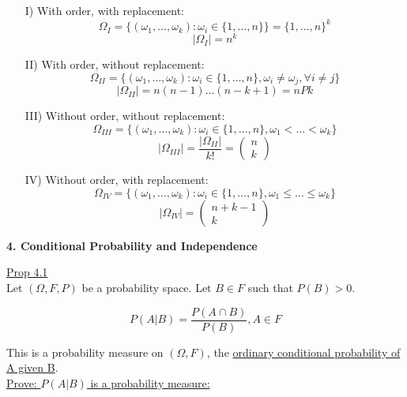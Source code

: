 \documentclass[10pt,letterpaper]{article}
\begin{document}
\begin{enumerate}
\item[I)] With order, with replacement:
$$\Omega_I=\{(\omega_1,\dots,\omega_k):\omega_i\in \{1,\dots,n\}\}=\{1,\dots,n\}^k$$
$$|\Omega_I|=n^k$$

\item[II)] With order, without replacement:
$$\Omega_{II}=\{(\omega_1,\dots,\omega_k):\omega_i\in \{1,\dots,n\}, \omega_i\neq\omega_j,
\forall i\neq j\}$$
$$|\Omega_{II}|=n(n-1)\dots (n-k+1)=nPk$$

\item[III)] Without order, without replacement:
$$\Omega_{III}=\{(\omega_1,\dots,\omega_k):\omega_i\in \{1,\dots,n\}, \omega_1<\dots<\omega_k\}$$
$$|\Omega_{III}|=\frac{|\Omega_{II}|}{k!}=
\begin{pmatrix}
    n\\
    k
\end{pmatrix}$$

\item[IV)] Without order, with replacement:
$$\Omega_{IV}=\{(\omega_1,\dots,\omega_k):\omega_i\in \{1,\dots,n\}, \omega_1\leq\dots\leq\omega_k\}$$
$$|\Omega_{IV}|=
\begin{pmatrix}
    n+k-1\\
    k
\end{pmatrix}$$

\end{enumerate}

\pagebreak

\begin{center}
\textbf{4. Conditional Probability and Independence}
\end{center}

\underline{Prop 4.1}\\

Let $(\Omega, F, P)$ be a probability space. Let $B\in F$ such that $P(B)>0$.

$$P(A|B)=\frac{P(A\cap B)}{P(B)}, A\in F$$

This is a probability measure on $(\Omega, F)$, the 
\underline{ordinary conditional probability of A given B}.\\

\underline{Prove: $P(A|B)$ is a probability measure:}\\
\end{document}
